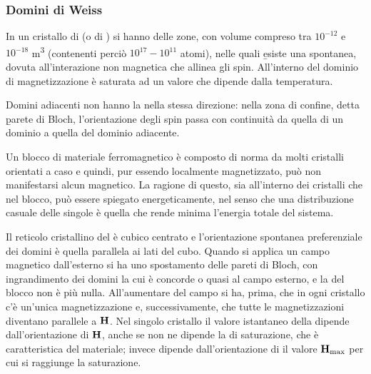 \subsubsection{Domini di Weiss}
In un cristallo di  (o di ) si hanno delle zone, con volume compreso tra $10^{-12}$ e $10^{-18}$ \si{m^3} (contenenti perciò $10^{17}-10^{11}$ atomi), nelle quali \b{esiste una \magn spontanea, dovuta all'interazione non magnetica che allinea gli spin}. All'interno del dominio di magnetizzazione è saturata ad un valore che dipende dalla temperatura.

Domini adiacenti non hanno la \magn nella stessa direzione: nella zona di confine, detta \b{parete di Bloch}, l'orientazione degli spin passa con continuità da quella di un dominio a quella del dominio adiacente.

Un blocco di materiale ferromagnetico è composto di norma da molti cristalli orientati a caso e quindi, pur essendo localmente magnetizzato, può non manifestarsi alcun \mom magnetico. La ragione di questo, sia all'interno dei cristalli che nel blocco, può essere spiegato energeticamente, nel senso che una distribuzione casuale delle singole \dM è quella che rende minima l'energia totale del sistema.

Il reticolo cristallino del  è cubico centrato e l'orientazione spontanea preferenziale dei domini è quella parallela ai lati del cubo. Quando si applica un campo magnetico dall'esterno si ha uno spostamento delle pareti di Bloch, con ingrandimento dei domini la cui \magn è concorde o quasi al campo esterno, e la \magn del blocco non è più nulla. All'aumentare del campo si ha, prima, che in ogni cristallo c'è un'unica magnetizzazione e, successivamente, che tutte le magnetizzazioni diventano parallele a $\mathbf{H}$. Nel singolo cristallo il valore istantaneo della \magn dipende dall'orientazione di $\mathbf{H}$, anche se non ne dipende la \magn di saturazione, che è caratteristica del materiale; invece dipende dall'orientazione di \dH il valore $\mathbf{H}_{\max}$ per cui si raggiunge la saturazione.